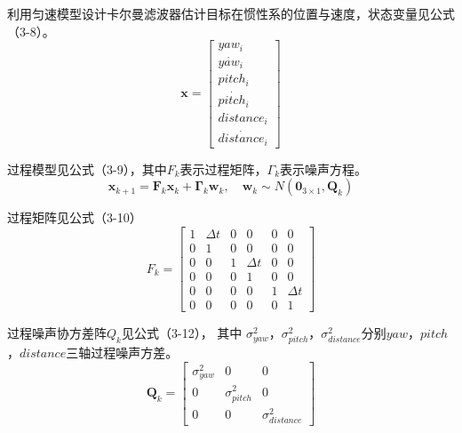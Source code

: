 利用匀速模型设计卡尔曼滤波器估计目标在惯性系的位置与速度，状态变量见公式（3-8）。\begin{equation} \boldsymbol x =\left[\begin{array}{c} yaw_i\\ \dot {yaw_i}\\ pitch_i\\ \dot {pitch_i} \\ distance_i\\ \dot {distance_i} \end{array}\right] \end{equation}
\par
过程模型见公式（3-9），其中$F_k$表示过程矩阵，$\Gamma_{k}$表示噪声方程。
\begin{equation} \boldsymbol  x_{k+1} = \boldsymbol F_k\boldsymbol  x_k + \boldsymbol{\Gamma}_{k}\boldsymbol {w}_{k}, \quad \boldsymbol {w}_{k} \sim N\left(\boldsymbol 0_{3 \times 1}, \boldsymbol Q_k \right) \end{equation}

过程矩阵见公式（3-10）
\begin{equation} F_k =\left[\begin{array}{cccccc} 1 &  \Delta t & 0 &0&0&0\\ 0 &  1 & 0 &0&0&0\\ 0 & 0 & 1&  \Delta t & 0 &0\\ 0&0&   0&1 &0 &0\\ 0 &0& 0 &0& 1 &\Delta t \\ 0 &0& 0 & 0 &0 &1 \end{array}\right] \end{equation}

过程噪声协方差阵$Q_k$见公式（3-12）， 其中 $\sigma_{yaw}^2$，$\sigma_{pitch}^2$，$\sigma_{distance}^2$分别$yaw$，$pitch$，$distance$三轴过程噪声方差。
\begin{equation} \boldsymbol Q_k =\left[\begin{array}{ccc} \sigma_{yaw}^2 &  0 & 0 \\ 0 &  \sigma_{pitch}^2 & 0 \\ 0 & 0 & \sigma_{distance}^2 \end{array}\right] \end{equation}
\par


